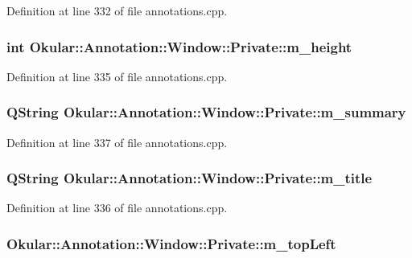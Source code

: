 Definition at line 332 of file annotations.\+cpp.

\hypertarget{classAnnotation_1_1Window_1_1Private_a8cfe2b5dc068db7c9577d59a6eec6777}{
\subsubsection[{m\+\_\+height}]{\setlength{\rightskip}{0pt plus 5cm}int Okular\+::\+Annotation\+::\+Window\+::\+Private\+::m\+\_\+height}}\label{classAnnotation_1_1Window_1_1Private_a8cfe2b5dc068db7c9577d59a6eec6777}


Definition at line 335 of file annotations.\+cpp.

\hypertarget{classAnnotation_1_1Window_1_1Private_af86162a20b353853fb2105e177ea176c}{
\subsubsection[{m\+\_\+summary}]{\setlength{\rightskip}{0pt plus 5cm}Q\+String Okular\+::\+Annotation\+::\+Window\+::\+Private\+::m\+\_\+summary}}\label{classAnnotation_1_1Window_1_1Private_af86162a20b353853fb2105e177ea176c}


Definition at line 337 of file annotations.\+cpp.

\hypertarget{classAnnotation_1_1Window_1_1Private_a6fc5ee6ecc332374e8aa14aa35231479}{
\subsubsection[{m\+\_\+title}]{\setlength{\rightskip}{0pt plus 5cm}Q\+String Okular\+::\+Annotation\+::\+Window\+::\+Private\+::m\+\_\+title}}\label{classAnnotation_1_1Window_1_1Private_a6fc5ee6ecc332374e8aa14aa35231479}


Definition at line 336 of file annotations.\+cpp.

\hypertarget{classAnnotation_1_1Window_1_1Private_a76b52c687c1f0e188e6f717f1f52717e}{
\subsubsection[{m\+\_\+top\+Left}]{ Okular\+::\+Annotation\+::\+Window\+::\+Private\+::m\+\_\+top\+Left}}\label{classAnnotation_1_1Window_1_1Private_a76b52c687c1f0e188e6f717f1f52717e}


